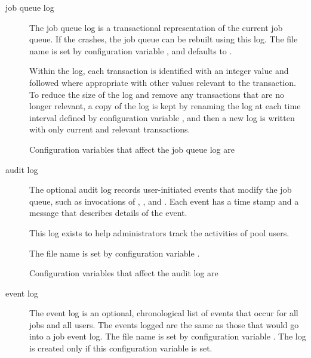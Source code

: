 \begin{description}
\item[job queue log]
  The job queue log is a transactional representation of the current job queue. 
  If the  crashes, the job queue can be rebuilt using
  this log.
  The file name is set by configuration variable ,
  and defaults to .

  Within the log,
  each transaction is identified with an integer value and followed where
  appropriate with other values relevant to the transaction.
  To reduce the size of the log and remove any transactions that are 
  no longer relevant,
  a copy of the log is kept
  by renaming the log at each time interval defined by configuration variable
  , 
  and then a new log is written with only current and relevant transactions. 

  Configuration variables that affect the job queue log are 
  \begin{description}
  \item [] 
  \item [] 
  \item [] 
  \item [] 
  \item [] 
  \end{description}

\item[ audit log]
  The optional  audit log records user-initiated events
  that modify the job queue, such as invocations of ,
  ,  and .
  Each event has a time stamp and a message that describes details of
  the event.

  This log exists to help administrators track the activities of pool users.

  The file name is set by configuration variable .

  Configuration variables that affect the audit log are 
  \begin{description}
  \item [] 
  \item [] 
  \end{description}

\item[event log]
  The event log is an optional, chronological list of events that occur
  for all jobs and all users.
  The events logged are the same as those that would go into a job event
  log.
  The file name is set by configuration variable .
  The log is created only if this configuration variable is set.


\end{description}
